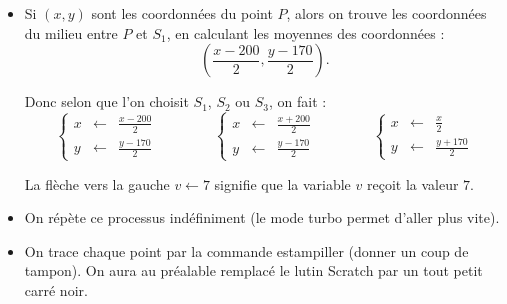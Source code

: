 \documentclass[class=report,crop=false, 12pt]{standalone}
\begin{document}
\begin{activite}
\begin{itemize}
  \item Si $(x,y)$ sont les coordonnées du point $P$, alors on trouve les coordonnées
  du milieu entre $P$ et $S_1$, en calculant les moyennes des coordonnées :
  $$\left(\frac{x-200}{2} , \frac{y-170}{2}\right).$$
  
  Donc selon que l'on choisit $S_1$, $S_2$ ou $S_3$, on fait :
  $$
  \left\{\begin{array}{rcl}x &\leftarrow& \frac{x - 200}{2} \\ y &\leftarrow& \frac{y -170}{2}\end{array}\right.\qquad\qquad
  \left\{\begin{array}{rcl}x &\leftarrow& \frac{x + 200}{2} \\ y &\leftarrow& \frac{y -170}{2}\end{array}\right.\qquad\qquad
  \left\{\begin{array}{rcl}x &\leftarrow& \frac{x}{2}  \\ y &\leftarrow& \frac{y + 170}{2}\end{array}\right.
  $$

  La flèche vers la gauche \og{}$v \leftarrow 7$\fg{} signifie que la variable $v$ reçoit la valeur $7$.
  
  \item On répète ce processus indéfiniment (le mode turbo permet d'aller plus vite).
  
  \item On trace chaque point par la commande \og estampiller \fg{} (donner un coup de tampon). On aura au préalable remplacé le lutin Scratch par un tout petit carré noir.
\end{itemize}


\end{activite}
\end{document}
